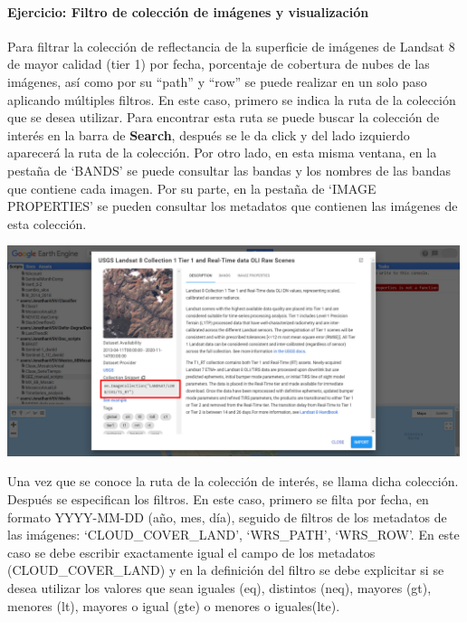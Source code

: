 \documentclass[
]{article}
\begin{document}
\hypertarget{ejercicio-filtro-de-colecciuxf3n-de-imuxe1genes-y-visualizaciuxf3n}{%
\paragraph{Ejercicio: Filtro de colección de imágenes y
visualización}\label{ejercicio-filtro-de-colecciuxf3n-de-imuxe1genes-y-visualizaciuxf3n}}

Para filtrar la colección de reflectancia de la superficie de imágenes
de Landsat 8 de mayor calidad (tier 1) por fecha, porcentaje de
cobertura de nubes de las imágenes, así como por su ``path'' y ``row''
se puede realizar en un solo paso aplicando múltiples filtros. En este
caso, primero se indica la ruta de la colección que se desea utilizar.
Para encontrar esta ruta se puede buscar la colección de interés en la
barra de \textbf{Search}, después se le da click y del lado izquierdo
aparecerá la ruta de la colección. Por otro lado, en esta misma ventana,
en la pestaña de `BANDS' se puede consultar las bandas y los nombres de
las bandas que contiene cada imagen. Por su parte, en la pestaña de
`IMAGE PROPERTIES' se pueden consultar los metadatos que contienen las
imágenes de esta colección.

\includegraphics[width=500px]{Img/Ruta_coleccion}

Una vez que se conoce la ruta de la colección de interés, se llama dicha
colección. Después se especifican los filtros. En este caso, primero se
filta por fecha, en formato YYYY-MM-DD (año, mes, día), seguido de
filtros de los metadatos de las imágenes: `CLOUD\_COVER\_LAND',
`WRS\_PATH', `WRS\_ROW'. En este caso se debe escribir exactamente igual
el campo de los metadatos (CLOUD\_COVER\_LAND) y en la definición del
filtro se debe explicitar si se desea utilizar los valores que sean
iguales (eq), distintos (neq), mayores (gt), menores (lt), mayores o
igual (gte) o menores o iguales(lte).
\end{document}
